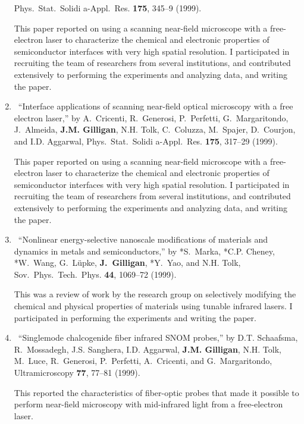 \begin{enumerate}
	  Phys.\ Stat.\ Solidi a-Appl.\ Res. \textbf{175}, 345--9 (1999). 
	  \begin{credit}
	  This paper reported on using a scanning near-field microscope with a free-electron laser to characterize the chemical and electronic properties of semiconductor interfaces with very high spatial resolution.
	  I participated in recruiting the team of researchers from several institutions, and contributed extensively to performing the experiments and analyzing data, and writing the paper.
	  \end{credit}
%	
	\item
	\textdagger\ 
	\enquote{Interface applications of scanning near-field optical microscopy with
	  a free electron laser,}  by A.~Cricenti, R.~Generosi, P.~Perfetti,
	  G.~Margaritondo, J.~Almeida, \textbf{J.M. Gilligan}, N.H. Tolk, C.~Coluzza,
	  M.~Spajer, D.~Courjon, and I.D. Aggarwal, Phys.\ Stat.\ Solidi a-Appl.\ Res.
	  \textbf{175}, 317--29 (1999). 
	  \begin{credit}
	  This paper reported on using a scanning near-field microscope with a free-electron laser to characterize the chemical and electronic properties of semiconductor interfaces with very high spatial resolution.
	  I participated in recruiting the team of researchers from several institutions, and contributed extensively to performing the experiments and analyzing data, and writing the paper.
	  \end{credit}
%	
	\item
	\textdagger\ 
	\enquote{Nonlinear energy-selective nanoscale modifications of materials and
	  dynamics in metals and semiconductors,}  by *S.~Marka, *C.P. Cheney, *W.~Wang,
	  G.~L\"upke, \textbf{J.~Gilligan}, *Y.~Yao, and N.H. Tolk, Sov.\ Phys.\ Tech.\ Phys.
	  \textbf{44}, 1069--72 (1999). 
	  \begin{credit}
	  This was a review of work by the research group on selectively modifying the chemical and physical properties of materials using tunable infrared lasers. I participated in performing the experiments and writing the paper.
	  \end{credit}
%	
	\item
	\textdagger\ 
	\enquote{Singlemode chalcogenide fiber infrared {SNOM} probes,}  by D.T.
	  Schaafsma, R.~Mossadegh, J.S. Sanghera, I.D. Aggarwal, \textbf{J.M. Gilligan},
	  N.H. Tolk, M.~Luce, R.~Generosi, P.~Perfetti, A.~Cricenti, and
	  G.~Margaritondo, Ultramicroscopy \textbf{77}, 77--81 (1999). 
	  \begin{credit}
	  This reported the characteristics of fiber-optic probes that made it possible to perform near-field microscopy with mid-infrared light from a free-electron laser.

\end{credit}
\end{enumerate}
